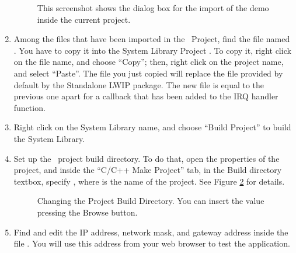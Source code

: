 \begin{enumerate}
\begin{figure}
\caption{\label{fig:lwip_import_filesystem}This screenshot shows the
dialog box for the import of the demo inside the current project.}
\end{figure}
%
\item Among the files that have been imported in the \rtd\ Project,
  find the file named . You have to
  copy it into the System Library Project . To
  copy it, right click on the file name, and choose ``Copy''; then,
  right click on the project name, and select ``Paste''. The file you
  just copied will replace the file provided by default by the
  Standalone LWIP package. The new file is equal to the previous one
  apart for a callback that has been added to the IRQ handler
  function.
\item Right click on the System Library name, and choose ``Build
  Project'' to build the System Library.
\item Set up the \rtd\ project build directory. To do that,
  open the properties of the project, and inside the ``C/C++ Make
  Project'' tab, in the Build directory textbox, specify
  , where  is the
  name of the project. See Figure \ref{fig:lwip-properties-make} for
  details.
%
\begin{figure}
\caption{\label{fig:lwip-properties-make}Changing the Project Build
Directory. You can insert the value pressing the Browse button.}
\end{figure}
%
\item Find and edit the IP address, network mask, and gateway address
  inside the file . You will use this address
  from your web browser to test the application.


\end{enumerate}
